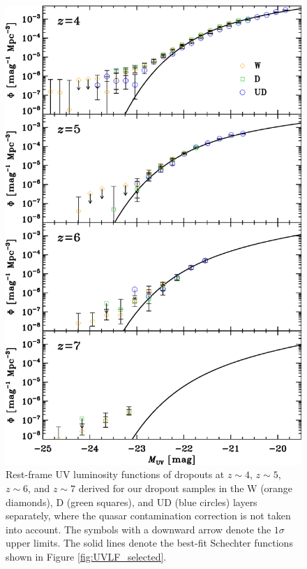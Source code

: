 \documentclass[]{pasj01}
\begin{document}
\begin{figure}
 \begin{center}
  \includegraphics[width=15cm]{lumi_func_separate.eps} 
 \end{center}
\caption{
Rest-frame UV luminosity functions of dropouts at $z \sim 4$, $z \sim 5$, $z \sim 6$, and $z \sim 7$ 
derived for our dropout samples in the 
W (orange diamonds), 
D (green squares), and 
UD (blue circles) 
layers separately,  
where the quasar contamination correction is not taken into account. 
The symbols with a downward arrow 
denote the $1\sigma$ upper limits. 
The solid lines denote the best-fit Schechter functions 
shown in Figure \ref{fig:UVLF_selected}.
}\label{fig:LF_for_each_field}
\end{figure}
\end{document}
